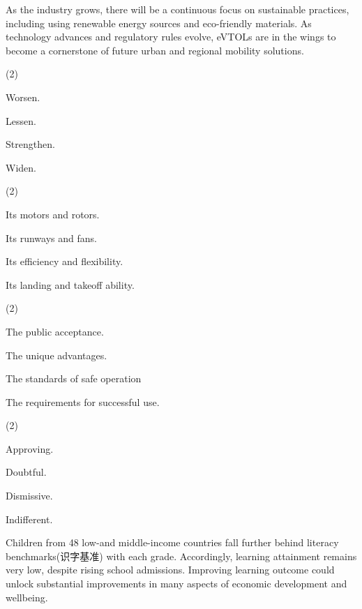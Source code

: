 \documentclass{英语试卷}
\begin{document}
\par As the industry grows, there will be a continuous focus on sustainable practices, including using renewable energy sources and eco-friendly materials. As technology advances and regulatory rules evolve, eVTOLs are in the wings to become a cornerstone of future urban and regional mobility solutions.\par
{}
\begin{choices}(2)
  \item Worsen.
  \item Lessen.
  \item Strengthen.
  \item Widen.
\end{choices}
\begin{choices}(2)
  \item Its motors and rotors.
  \item Its runways and fans.
  \item Its efficiency and flexibility.
  \item Its landing and takeoff ability.
\end{choices}
\begin{choices}(2)
  \item The public acceptance.
  \item The unique advantages.
  \item The standards of safe operation
  \item The requirements for successful use.
\end{choices}
\begin{choices}(2)
  \item Approving.
  \item Doubtful.
  \item Dismissive.
  \item Indifferent.
\end{choices}
\par Children from 48 low-and middle-income countries fall further behind literacy benchmarks(识字基准) with each grade. Accordingly, learning attainment remains very low, despite rising school admissions. Improving learning outcome could unlock substantial improvements in many aspects of economic development and wellbeing.\par
\end{document}
